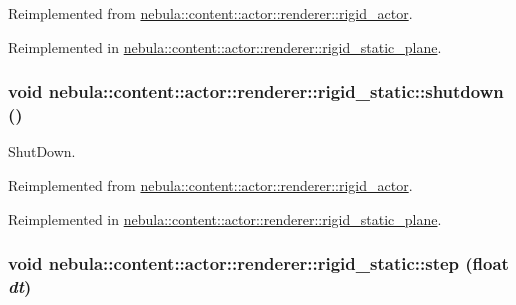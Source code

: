 Reimplemented from \hyperlink{classnebula_1_1content_1_1actor_1_1renderer_1_1rigid__actor_a099097e3dd6511e0ae3a25a9f092efcf}{nebula::content::actor::renderer::rigid\_\-actor}.

Reimplemented in \hyperlink{classnebula_1_1content_1_1actor_1_1renderer_1_1rigid__static__plane_a77394d3465965bdb4bc7aeb7a0290757}{nebula::content::actor::renderer::rigid\_\-static\_\-plane}.\hypertarget{classnebula_1_1content_1_1actor_1_1renderer_1_1rigid__static_a33ba501805701c5069344a5126830898}{
\subsubsection[{shutdown}]{\setlength{\rightskip}{0pt plus 5cm}void nebula::content::actor::renderer::rigid\_\-static::shutdown ()}}
\label{classnebula_1_1content_1_1actor_1_1renderer_1_1rigid__static_a33ba501805701c5069344a5126830898}


ShutDown. 

Reimplemented from \hyperlink{classnebula_1_1content_1_1actor_1_1renderer_1_1rigid__actor_a9d1be32a4ba87de355247219e4e9f104}{nebula::content::actor::renderer::rigid\_\-actor}.

Reimplemented in \hyperlink{classnebula_1_1content_1_1actor_1_1renderer_1_1rigid__static__plane_ac0d85518481b3d6fc0d15402c6878ed9}{nebula::content::actor::renderer::rigid\_\-static\_\-plane}.\hypertarget{classnebula_1_1content_1_1actor_1_1renderer_1_1rigid__static_a1423732157573e9276023a54471b3f3a}{
\subsubsection[{step}]{\setlength{\rightskip}{0pt plus 5cm}void nebula::content::actor::renderer::rigid\_\-static::step (float {\em dt})}}
\label{classnebula_1_1content_1_1actor_1_1renderer_1_1rigid__static_a1423732157573e9276023a54471b3f3a}


